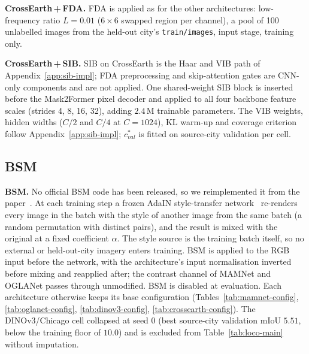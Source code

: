 \textbf{CrossEarth\,+\,FDA.}  FDA is applied as for the other
architectures: low-frequency ratio $L{=}0.01$ ($6{\times}6$ swapped
region per channel), a pool of 100 unlabelled images from the held-out
city's \texttt{train/images}, input stage, training only.

\textbf{CrossEarth\,+\,SIB.}  SIB on CrossEarth is the Haar and VIB path
of Appendix~\ref{app:sib-impl}; FDA preprocessing and skip-attention
gates are CNN-only components and are not applied.  One shared-weight
SIB block is inserted before the Mask2Former pixel decoder and applied
to all four backbone feature scales (strides 4, 8, 16, 32), adding
$2.4$\,M trainable parameters.  The VIB weights, hidden widths ($C/2$
and $C/4$ at $C{=}1024$), KL warm-up and coverage criterion follow
Appendix~\ref{app:sib-impl}; $c^*_{val}$ is fitted on source-city
validation per cell.

\subsection{BSM}
\label{sec:bsm}

\textbf{BSM.}
No official BSM code has been released, so we reimplemented it from
the paper~\cite{luo2023bsm}.  At each training step a frozen AdaIN
style-transfer network~\cite{huang2017adain} re-renders every image in
the batch with the style of another image from the same batch (a random
permutation with distinct pairs), and the result is mixed with the
original at a fixed coefficient $\alpha$.  The style source is the
training batch itself, so no external or held-out-city imagery enters
training.  BSM is applied to the RGB input before the network, with the
architecture's input normalisation inverted before mixing and reapplied
after; the contrast channel of MAMNet and OGLANet passes through
unmodified.  BSM is disabled at evaluation.  Each architecture otherwise
keeps its base configuration (Tables~\ref{tab:mamnet-config},
\ref{tab:oglanet-config}, \ref{tab:dinov3-config},
\ref{tab:crossearth-config}).  The DINOv3/Chicago cell collapsed at
seed 0 (best source-city validation mIoU $5.51$, below the training
floor of $10.0$) and is excluded from Table~\ref{tab:loco-main} without
imputation.

